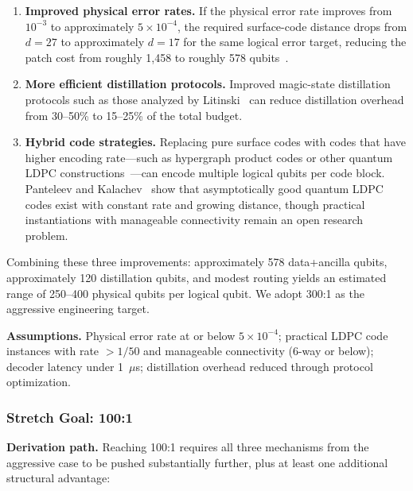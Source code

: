 \documentclass[conference]{IEEEtran}
\begin{document}
\begin{enumerate}
\item \textbf{Improved physical error rates.} If the physical error rate improves from $10^{-3}$ to approximately $5 \times 10^{-4}$, the required surface-code distance drops from $d = 27$ to approximately $d = 17$ for the same logical error target, reducing the patch cost from roughly 1,458 to roughly 578 qubits~\cite{fowler2012}.

\item \textbf{More efficient distillation protocols.} Improved magic-state distillation protocols such as those analyzed by Litinski~\cite{litinski2019} can reduce distillation overhead from 30--50\% to 15--25\% of the total budget.

\item \textbf{Hybrid code strategies.} Replacing pure surface codes with codes that have higher encoding rate---such as hypergraph product codes or other quantum LDPC constructions~\cite{panteleev2022}---can encode multiple logical qubits per code block. Panteleev and Kalachev~\cite{panteleev2022} show that asymptotically good quantum LDPC codes exist with constant rate and growing distance, though practical instantiations with manageable connectivity remain an open research problem.
\end{enumerate}

Combining these three improvements: approximately 578 data+ancilla qubits, approximately 120 distillation qubits, and modest routing yields an estimated range of 250--400 physical qubits per logical qubit. We adopt 300:1 as the aggressive engineering target.

\textbf{Assumptions.} Physical error rate at or below $5 \times 10^{-4}$; practical LDPC code instances with rate $> 1/50$ and manageable connectivity (6-way or below); decoder latency under 1~$\mu$s; distillation overhead reduced through protocol optimization.

\subsubsection{Stretch Goal: 100:1}

\textbf{Derivation path.} Reaching 100:1 requires all three mechanisms from the aggressive case to be pushed substantially further, plus at least one additional structural advantage:
\end{document}
